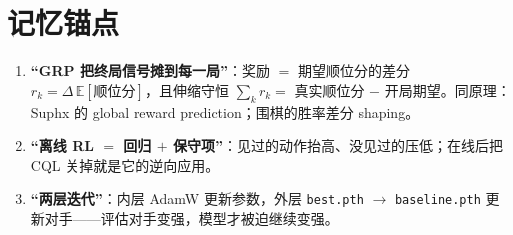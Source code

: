\documentclass[11pt,a4paper]{ctexart}
\newcommand{\E}{\mathbb{E}}
\theoremstyle{remark}
\begin{document}
\section{记忆锚点}

\begin{enumerate}[leftmargin=2em]
  \item \textbf{``GRP 把终局信号摊到每一局''}：奖励 $=$ 期望顺位分的差分 $r_k = \Delta\,\E[\text{顺位分}]$，且伸缩守恒 $\sum_k r_k = $ 真实顺位分 $-$ 开局期望。同原理：Suphx 的 global reward prediction；围棋的胜率差分 shaping。
  \item \textbf{``离线 RL $=$ 回归 $+$ 保守项''}：见过的动作抬高、没见过的压低；在线后把 CQL 关掉就是它的逆向应用。
  \item \textbf{``两层迭代''}：内层 AdamW 更新参数，外层 \texttt{best.pth} $\to$ \texttt{baseline.pth} 更新对手——评估对手变强，模型才被迫继续变强。
\end{enumerate}
\end{document}
